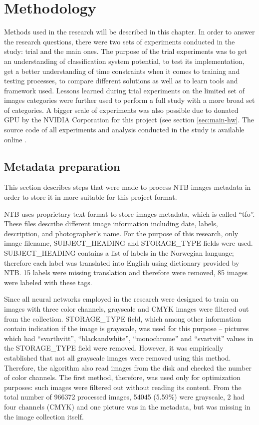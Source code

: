 \chapter{Methodology}
\label{chap:methods}

Methods used in the research will be described in this chapter. In order to answer the research questions, there were two sets of experiments conducted in the study: trial and the main ones. The purpose of the trial experiments was to get an understanding of classification system potential, to test its implementation, get a better understanding of time constraints when it comes to training and testing processes, to compare different solutions as well as to learn tools and framework used. Lessons learned during trial experiments on the limited set of images categories were further used to perform a full study with a more broad set of categories. A bigger scale of experiments was also possible due to donated GPU by the NVIDIA Corporation for this project (see section \ref{sec:main-hw}. The source code of all experiments and analysis conducted in the study is available online \cite{master-thesis-src}.


\section{Metadata preparation}
\label{sec:metadata-prep}
This section describes steps that were made to process NTB images metadata in order to store it in more suitable for this project format.

NTB uses proprietary text format to store images metadata, which is called ``tfo''. These files describe different image information including date, labels, description, and photographer's name. For the purpose of this research, only image filename, SUBJECT\_HEADING and STORAGE\_TYPE fields were used. SUBJECT\_HEADING contains a list of labels in the Norwegian language; therefore each label was translated into English using dictionary provided by NTB. 15 labels were missing translation and therefore were removed, 85 images were labeled with these tags.

Since all neural networks employed in the research were designed to train on images with three color channels, grayscale and CMYK images were filtered out from the collection. STORAGE\_TYPE field, which among other information contain indication if the image is grayscale, was used for this purpose -- pictures which had ``svarthvitt'', ``blackandwhite'', ``monochrome'' and ``svartvit'' values in the STORAGE\_TYPE field were removed. However, it was empirically established that not all grayscale images were removed using this method. Therefore, the algorithm also read images from the disk and checked the number of color channels. The first method, therefore, was used only for optimization purposes: such images were filtered out without reading its content. From the total number of 966372 processed images, 54045 (5.59\%) were grayscale, 2 had four channels (CMYK) and one picture was in the metadata, but was missing in the image collection itself.

